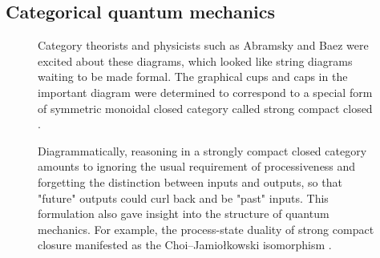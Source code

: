 \subsection{Categorical quantum mechanics}

\begin{figure}[h!]
\centering
{}
\caption{Category theorists and physicists such as Abramsky and Baez were excited about these diagrams, which looked like string diagrams waiting to be made formal. The graphical cups and caps in the important diagram were determined to correspond to a special form of symmetric monoidal closed category called strong compact closed \citep{abramskyAbstractScalarsLoops2009a}.}
\end{figure}

\begin{figure}[h!]
\centering
{}
\caption{Diagrammatically, reasoning in a strongly compact closed category amounts to ignoring the usual requirement of processiveness and forgetting the distinction between inputs and outputs, so that "future" outputs could curl back and be "past" inputs. This formulation also gave insight into the structure of quantum mechanics. For example, the process-state duality of strong compact closure manifested as the Choi–Jamiołkowski isomorphism \citep{choiCompletelyPositiveLinear1975,jamiolkowskiLinearTransformationsWhich1972}.}
\end{figure}

